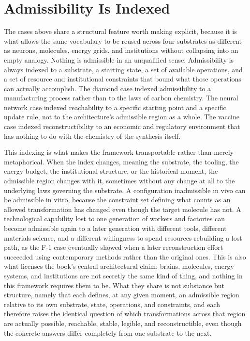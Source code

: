\documentclass[11pt]{book}
\begin{document}
\section{Admissibility Is Indexed}

The cases above share a structural feature worth making explicit, because it is what allows the same vocabulary to be reused across four substrates as different as neurons, molecules, energy grids, and institutions without collapsing into an empty analogy. Nothing is admissible in an unqualified sense. Admissibility is always indexed to a substrate, a starting state, a set of available operations, and a set of resource and institutional constraints that bound what those operations can actually accomplish. The diamond case indexed admissibility to a manufacturing process rather than to the laws of carbon chemistry. The neural network case indexed reachability to a specific starting point and a specific update rule, not to the architecture's admissible region as a whole. The vaccine case indexed reconstructibility to an economic and regulatory environment that has nothing to do with the chemistry of the synthesis itself.

This indexing is what makes the framework transportable rather than merely metaphorical. When the index changes, meaning the substrate, the tooling, the energy budget, the institutional structure, or the historical moment, the admissible region changes with it, sometimes without any change at all to the underlying laws governing the substrate. A configuration inadmissible in vivo can be admissible in vitro, because the constraint set defining what counts as an allowed transformation has changed even though the target molecule has not. A technological capability lost to one generation of workers and factories can become admissible again to a later generation with different tools, different materials science, and a different willingness to spend resources rebuilding a lost path, as the F-1 case eventually showed when a later reconstruction effort succeeded using contemporary methods rather than the original ones. This is also what licenses the book's central architectural claim: brains, molecules, energy systems, and institutions are not secretly the same kind of thing, and nothing in this framework requires them to be. What they share is not substance but structure, namely that each defines, at any given moment, an admissible region relative to its own substrate, state, operations, and constraints, and each therefore raises the identical question of which transformations across that region are actually possible, reachable, stable, legible, and reconstructible, even though the concrete answers differ completely from one substrate to the next.
\end{document}
